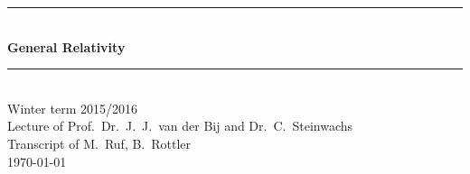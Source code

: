 \newcommand{\HRule}{\rule{\linewidth}{0.5mm}}
\begin{titlepage}
\begin{center}
  \HRule \\[0.4cm]
  { \huge \bfseries General Relativity}\\
  \HRule \\[0.5cm]
  \large Winter term 2015/2016 \\[0.5cm]  
  Lecture of Prof.\ Dr.\ J.\ J.\ van der Bij and Dr.\ C.\ Steinwachs\\
  Transcript of M.\ Ruf, B.\ Rottler\\[1.5cm]
  \today
  \vfill
  \normalsize
   \\
   \\
\end{center}
\end{titlepage}
